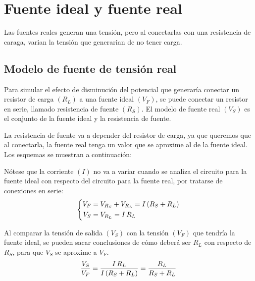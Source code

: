 \documentclass[a5paper,12pt,twoside]{book}
\begin{document}
\section{Fuente ideal y fuente real}

Las fuentes reales generan una tensión, pero al conectarlas con una resistencia de caraga, varian la tensión que generarian de no tener carga.


\subsection*{Modelo de fuente de tensión real}

Para simular el efecto de disminución del potencial que generaría conectar un resistor de carga $(R_L)$ a una fuente ideal $(V_F)$, se puede conectar un resistor en serie, llamado resistencia de fuente $(R_S)$. El modelo de fuente real $(V_S)$ es el conjunto de la fuente ideal y la resistencia de fuente.

La resistencia de fuente va a depender del resistor de carga, ya que queremos que al conectarla, la fuente real tenga un valor que se aproxime al de la fuente ideal. Los esquemas se muestran a continuación:

\begin{multicols}{2}
    \begin{center}
        \def\svgwidth{0.9\linewidth}
        
    \end{center}
    \begin{center}
        \def\svgwidth{0.9\linewidth}
        
    \end{center}
\end{multicols}

Nótese que la corriente $(I)$ no va a variar cuando se analiza el circuito para la fuente ideal con respecto del circuito para la fuente real, por tratarse de conexiones en serie:
\begin{equation*}
    \left\{
    \begin{aligned}
        V_F &= V_{R_S} + V_{R_L} = I \left(R_S + R_L\right)
        \\
        V_S &= V_{R_L} = I \, R_L
    \end{aligned}
    \right.
\end{equation*}

Al comparar la tensión de salida $(V_S)$ con la tensión $(V_F)$ que tendría la fuente ideal, se pueden sacar conclusiones de cómo deberá ser $R_L$ con respecto de $R_S$, para que $V_S$ se aproxime a $V_F$.
\begin{equation*}
    \frac{V_S}{V_F} = \frac{I \, R_L}{I \left(R_S + R_L\right)} = \frac{R_L}{R_S + R_L}
\end{equation*}
\end{document}
